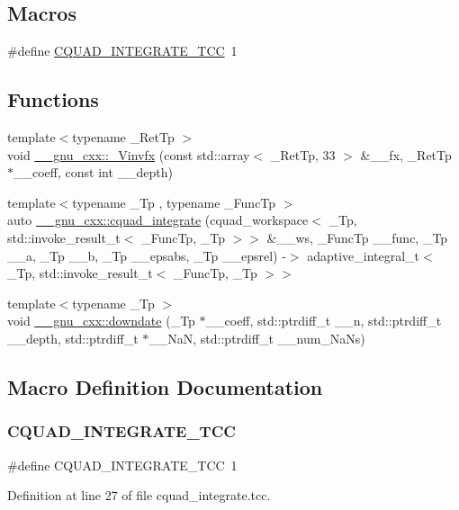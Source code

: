 \subsection*{Macros}
\begin{DoxyCompactItemize}
\item 
\#define \hyperlink{cquad__integrate_8tcc_a476c60286a48a81f7de414958775fa1e}{C\+Q\+U\+A\+D\+\_\+\+I\+N\+T\+E\+G\+R\+A\+T\+E\+\_\+\+T\+CC}~1
\end{DoxyCompactItemize}
\subsection*{Functions}
\begin{DoxyCompactItemize}
\item 
{\footnotesize template$<$typename \+\_\+\+Ret\+Tp $>$ }\\void \hyperlink{namespace____gnu__cxx_a6215f0335d2b6f478726299660ccca4e}{\+\_\+\+\_\+gnu\+\_\+cxx\+::\+\_\+\+Vinvfx} (const std\+::array$<$ \+\_\+\+Ret\+Tp, 33 $>$ \&\+\_\+\+\_\+fx, \+\_\+\+Ret\+Tp $\ast$\+\_\+\+\_\+coeff, const int \+\_\+\+\_\+depth)
\item 
{\footnotesize template$<$typename \+\_\+\+Tp , typename \+\_\+\+Func\+Tp $>$ }\\auto \hyperlink{namespace____gnu__cxx_a569f7c4b604e9539bddd25996c5e67b6}{\+\_\+\+\_\+gnu\+\_\+cxx\+::cquad\+\_\+integrate} (cquad\+\_\+workspace$<$ \+\_\+\+Tp, std\+::invoke\+\_\+result\+\_\+t$<$ \+\_\+\+Func\+Tp, \+\_\+\+Tp $>$$>$ \&\+\_\+\+\_\+ws, \+\_\+\+Func\+Tp \+\_\+\+\_\+func, \+\_\+\+Tp \+\_\+\+\_\+a, \+\_\+\+Tp \+\_\+\+\_\+b, \+\_\+\+Tp \+\_\+\+\_\+epsabs, \+\_\+\+Tp \+\_\+\+\_\+epsrel) -\/$>$ adaptive\+\_\+integral\+\_\+t$<$ \+\_\+\+Tp, std\+::invoke\+\_\+result\+\_\+t$<$ \+\_\+\+Func\+Tp, \+\_\+\+Tp $>$$>$
\item 
{\footnotesize template$<$typename \+\_\+\+Tp $>$ }\\void \hyperlink{namespace____gnu__cxx_a3a0de8d324d776aa6b7f631559da4d7c}{\+\_\+\+\_\+gnu\+\_\+cxx\+::downdate} (\+\_\+\+Tp $\ast$\+\_\+\+\_\+coeff, std\+::ptrdiff\+\_\+t \+\_\+\+\_\+n, std\+::ptrdiff\+\_\+t \+\_\+\+\_\+depth, std\+::ptrdiff\+\_\+t $\ast$\+\_\+\+\_\+\+NaN, std\+::ptrdiff\+\_\+t \+\_\+\+\_\+num\+\_\+\+Na\+Ns)
\end{DoxyCompactItemize}


\subsection{Macro Definition Documentation}
\mbox{\label{cquad__integrate_8tcc_a476c60286a48a81f7de414958775fa1e}} 
\subsubsection{\texorpdfstring{C\+Q\+U\+A\+D\+\_\+\+I\+N\+T\+E\+G\+R\+A\+T\+E\+\_\+\+T\+CC}{CQUAD\_INTEGRATE\_TCC}}
{\footnotesize\ttfamily \#define C\+Q\+U\+A\+D\+\_\+\+I\+N\+T\+E\+G\+R\+A\+T\+E\+\_\+\+T\+CC~1}



Definition at line 27 of file cquad\+\_\+integrate.\+tcc.

